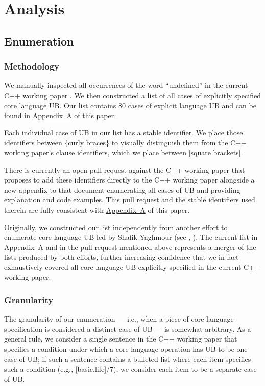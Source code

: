 \section{Analysis}
\label{analysis}

\subsection{Enumeration}

\subsubsection{Methodology}

We manually inspected all occurrences of the word ``undefined'' in the current C++ working paper \cite{N5008}. We then constructed a list of all cases of explicitly specified core language UB. Our list contains 80 cases of explicit language UB and can be found in \hyperref[appendix]{Appendix~A} of this paper. 

Each individual case of UB in our list has a stable identifier. We place those identifiers between \{curly braces\} to visually distinguish them from the C++ working paper's clause identifiers, which we place between [square brackets]. 

There is currently an open pull request against the C++ working paper that proposes to add these identifiers directly to the C++ working paper alongside a new appendix to that document enumerating all cases of UB and providing explanation and code examples. This pull request and the stable identifiers used therein are fully consistent with \hyperref[appendix]{Appendix~A} of this paper. 

Originally, we constructed our list independently from another effort to enumerate core language UB led by Shafik Yaghmour (see \cite{P1705R1}, \cite{P3075R0}). The current list in \hyperref[appendix]{Appendix~A} and in the pull request mentioned above represents a merger of the lists produced by both efforts, further increasing confidence that we in fact exhaustively covered all core language UB explicitly specified in the current C++ working paper.

\subsubsection{Granularity}

The granularity of our enumeration --- i.e., when a piece of core language specification is considered a distinct case of UB --- is somewhat arbitrary. As a general rule, we consider a single sentence in the C++ working paper that specifies a condition under which a core language operation has UB to be one case of UB; if such a sentence contains a bulleted list where each item specifies such a condition (e.g., [basic.life]/7), we consider each item to be a separate case of UB.

